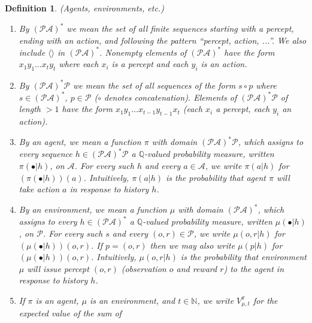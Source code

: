 \documentclass{article}
\newtheorem{definition}[theorem]{Definition}
\begin{document}
\begin{definition}
\label{omnibusdefn}
    (Agents, environments, etc.)
    \begin{enumerate}
        \item
        By $(\mathcal P\mathcal A)^*$ we mean the set of
        all finite sequences
        starting with a percept, ending with an action,
        and following the pattern ``percept, action, ...''.
        We also include $\langle\rangle$ in $(\mathcal P\mathcal A)^*$.
        Nonempty elements of $(\mathcal P\mathcal A)^*$ have the
        form $x_1y_1\ldots x_ty_t$ where each $x_i$ is a percept and
        each $y_i$ is an action.
        \item
        By $(\mathcal P\mathcal A)^* \mathcal P$
        we mean the set of all sequences of the form $s\circ p$ where
        $s\in (\mathcal P\mathcal A)^*$, $p\in\mathcal P$
        ($\circ$ denotes concatenation).
        Elements of $(\mathcal P\mathcal A)^* \mathcal P$
        of length $>1$ have the form
        $x_1y_1\ldots x_{t-1}y_{t-1}x_t$
        (each $x_i$ a percept, each $y_i$ an action).
        \item
        By an \emph{agent}, we mean a function $\pi$
        with domain $(\mathcal P\mathcal A)^* \mathcal P$,
        which assigns to every sequence
        $h\in (\mathcal P\mathcal A)^* \mathcal P$ a
        $\mathbb Q$-valued probability measure,
        written $\pi(\bullet|h)$, on $\mathcal A$.
        For every such $h$ and every $a\in\mathcal A$,
        we write $\pi(a|h)$ for $(\pi(\bullet|h))(a)$.
        Intuitively, $\pi(a|h)$ is the probability that agent $\pi$
        will take action $a$ in response to history $h$.
        \item
        By an \emph{environment}, we mean a function $\mu$
        with domain $(\mathcal P\mathcal A)^*$,
        which assigns to every
        $h\in (\mathcal P\mathcal A)^*$
        a $\mathbb Q$-valued probability measure,
        written $\mu(\bullet|h)$,
        on $\mathcal P$.
        For every such $s$ and every $(o,r)\in\mathcal P$,
        we write $\mu(o,r|h)$ for $(\mu(\bullet|h))(o,r)$.
        If $p=(o,r)$ then we may also write $\mu(p|h)$ for
        $(\mu(\bullet|h))(o,r)$.
        Intuitively, $\mu(o,r|h)$ is the probability that environment
        $\mu$ will issue percept $(o,r)$ (observation $o$ and reward $r$)
        to the agent in response to history $h$.
        \item
        If $\pi$ is an agent, $\mu$ is an environment, and $t\in\mathbb N$,
        we write $V^\pi_{\mu,t}$ for the expected value of the sum of

\end{enumerate}
\end{definition}
\end{document}
